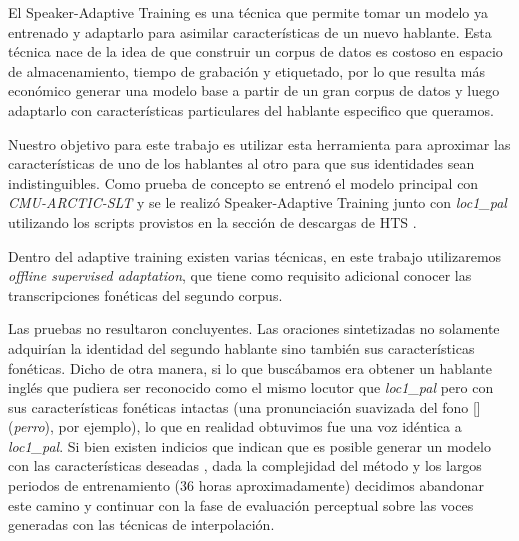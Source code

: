 El Speaker-Adaptive Training es una técnica que permite tomar un modelo ya entrenado y adaptarlo para asimilar características de un nuevo hablante. Esta técnica nace de la idea de que construir un corpus de datos es costoso en espacio de almacenamiento, tiempo de grabación y etiquetado, por lo que resulta más económico generar una modelo base a partir de un gran corpus de datos y luego adaptarlo con características particulares del hablante especifico que queramos.

Nuestro objetivo para este trabajo es utilizar esta herramienta para aproximar las características de uno de los hablantes al otro para que sus identidades sean indistinguibles. Como prueba de concepto se entrenó el modelo principal con \textit{CMU-ARCTIC-SLT} y se le realizó Speaker-Adaptive Training junto con \textit{loc1\_pal} utilizando los scripts provistos en la sección de descargas de HTS \cite{speakerAdaptativeTrainingLink}.

Dentro del adaptive training existen varias técnicas, en este trabajo utilizaremos \textit{offline supervised adaptation}, que tiene como requisito adicional conocer las transcripciones fonéticas del segundo corpus. 

Las pruebas no resultaron concluyentes. Las oraciones sintetizadas no solamente adquirían la identidad del segundo hablante sino también sus características fonéticas. Dicho de otra manera, si lo que buscábamos era obtener un hablante inglés que pudiera ser reconocido como el mismo locutor que \textit{loc1\_pal} pero con sus características fonéticas intactas (una pronunciación suavizada del fono [] (\textit{perro}), por ejemplo), lo que en realidad obtuvimos fue una voz idéntica a \textit{loc1\_pal}. Si bien existen indicios que indican que es posible generar un modelo con las características deseadas \cite{statisticalParam} \cite{speakerSim}, dada la complejidad del método y los largos periodos de entrenamiento ($36$ horas aproximadamente) decidimos abandonar este camino y continuar con la fase de evaluación perceptual sobre las voces generadas con las técnicas de interpolación.